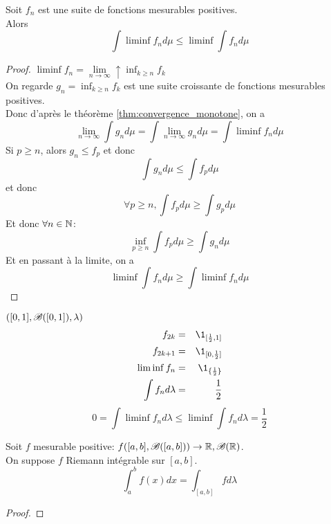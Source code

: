 \begin{theorem}
	Soit $f_n$ est une suite de fonctions mesurables positives.\\
	Alors
	$$ \int \liminf f_n d\mu \leq \liminf \int f_n d\mu $$
\end{theorem}

\begin{proof}
	$\liminf f_n = \lim\limits_{n \to \infty} \uparrow \inf_{k \geq n} f_k$\\
	On regarde $g_n = \inf_{k \geq n} f_k$ est une suite croissante de fonctions mesurables positives.\\
	Donc d'après le théorème \ref{thm:convergence_monotone}, on a
	$$ \lim\limits_{n \to \infty} \int g_n d\mu = \int \lim\limits_{n \to \infty} g_n d\mu = \int \liminf f_n d\mu $$
	Si $p \geq n$, alors $g_n \leq f_p$ et donc
	$$ \int g_n d\mu \leq \int f_p d\mu $$
	et donc
	$$ \forall p \geq n, \int f_p d\mu \geq \int g_p d\mu $$
	Et donc $\forall n \in \mathbb{N}$:
	$$ \inf_{p \geq n} \int f_p d\mu \geq \int g_n d\mu $$
	Et en passant à la limite, on a
	$$ \liminf \int f_n d\mu \geq \int \liminf f_n d\mu $$
\end{proof}


\begin{example} $([0,1], \mathscr{B}([0,1]),\lambda)$\\
	\begin{eqnarray*}
		f_{2k} &=& \1_{[\frac{1}{2}, 1]}\\
		f_{2k+1} &=& \1_{[0,\frac{1}{2}]}\\
		\liminf f_n &=& \1_{\{\frac{1}{2}\}}\\
		\int f_n d \lambda &=& \frac{1}{2}
	\end{eqnarray*}
	$$ 0 = \int \liminf f_n d \lambda \leq \liminf \int f_n d \lambda = \frac{1}{2} $$
\end{example}


\begin{theorem}
	Soit $f$ mesurable positive:
	$ f ([a,b], \mathscr{B}([a,b])) \to \mathbb{R}, \mathscr{B}(\mathbb{R})$.\\
	On suppose $f$ Riemann intégrable sur $[a,b]$.\\
	$$ \int_a^b f(x) dx = \int_{[a,b]} f d\lambda $$
\end{theorem}

\begin{proof}
\end{proof}
